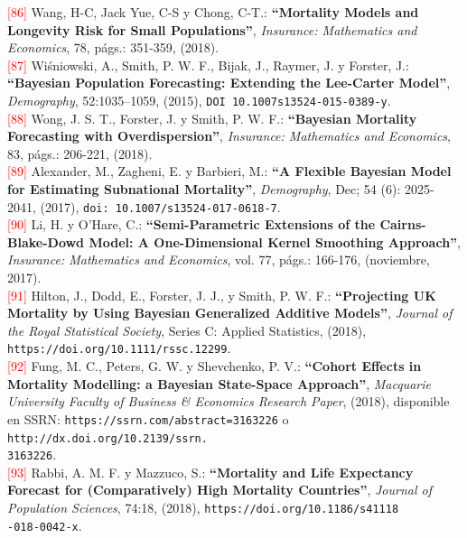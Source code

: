 \noindent \textcolor{red}{[86]} Wang, H-C, Jack Yue, C-S y Chong, C-T.: \textbf{``Mortality Models and Longevity Risk for Small Populations''}, \textit{Insurance: Mathematics and Economics}, 78, págs.: 351-359, (2018).\\

\noindent \textcolor{red}{[87]} Wiśniowski, A., Smith, P. W. F., Bijak, J., Raymer, J. y Forster, J.: \textbf{``Bayesian Population Forecasting: Extending the Lee-Carter Model''}, \textit{Demography}, 52:1035–1059, (2015),  {\small{\texttt{DOI 10.1007s13524-015-0389-y}}}.\\

\noindent \textcolor{red}{[88]} Wong, J. S. T., Forster, J. y Smith, P. W. F.: \textbf{``Bayesian Mortality Forecasting with Overdispersion''}, \textit{Insurance: Mathematics and Economics}, 83, págs.: 206-221, (2018).\\

\noindent \textcolor{red}{[89]} Alexander, M., Zagheni, E. y Barbieri, M.: \textbf{``A Flexible Bayesian Model for Estimating Subnational Mortality''}, \textit{Demography}, Dec; 54 (6): 2025-2041, (2017), {\small{\texttt{doi: 10.1007/s13524-017-0618-7}}}.\\

\noindent \textcolor{red}{[90]} Li, H. y O'Hare, C.: \textbf{``Semi-Parametric Extensions of the Cairns-Blake-Dowd Model: A One-Dimensional Kernel Smoothing Approach''}, \textit{Insurance: Mathematics and Economics}, vol. 77, págs.: 166-176, (noviembre, 2017).\\

\noindent \textcolor{red}{[91]} Hilton, J., Dodd, E., Forster, J. J., y Smith, P. W. F.: \textbf{``Projecting UK Mortality by Using Bayesian Generalized Additive Models''}, \textit{Journal of the Royal Statistical Society}, Series C: Applied Statistics, (2018), {\small{\texttt{https://doi.org/10.1111/rssc.12299}}}.\\

\noindent \textcolor{red}{[92]} Fung, M. C., Peters, G. W. y Shevchenko, P. V.: \textbf{``Cohort Effects in Mortality Modelling: a Bayesian
State-Space Approach''}, \textit{Macquarie University Faculty of Business \& Economics Research Paper}, (2018), disponible en SSRN:  {\small{\texttt{https://ssrn.com/abstract=3163226}}} o {\small{\texttt{http://dx.doi.org/10.2139/ssrn.\\
3163226}}}.\\

\noindent \textcolor{red}{[93]} Rabbi, A. M. F. y Mazzuco, S.: \textbf{``Mortality and Life Expectancy Forecast for (Comparatively) High Mortality Countries''}, \textit{Journal of Population Sciences}, 74:18, (2018), {\small{\texttt{https://doi.org/10.1186/s41118\\
-018-0042-x}}}.\\

